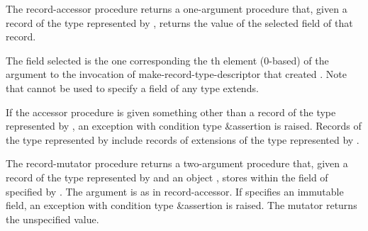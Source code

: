 \begin{entry}{%
}

The {\cf record-accessor} procedure returns a one-argument procedure that, given a
record of the type represented by , returns the value of the
selected field of that record.

The field selected is the one corresponding the th element
(0-based) of the  argument to the invocation of {\cf
  make-record-type-descriptor} that created . Note that
 cannot be used to specify a field of any type  extends.

If the accessor procedure is given something other than
a record of the type represented by , an exception with
condition type {\cf\&assertion} is raised.  Records
of the type represented by  include records of extensions of
the type represented by .
\end{entry}

\begin{entry}{%
}
   
The {\cf record-mutator} procedure returns a two-argument procedure that, given a
record  of the type represented by  and an object
, stores  within the field of  specified by
. The  argument is as in {\cf record-accessor}. If
 specifies an immutable field, an exception with condition type
{\cf\&assertion} is raised.
The mutator returns the unspecified value.
\end{entry}


